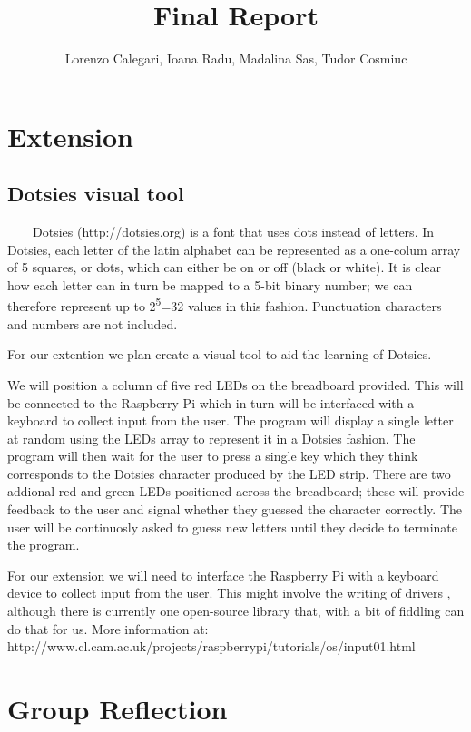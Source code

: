 \documentclass{article}
\newcommand{\tmrsup}[1]{\textsuperscript{#1}}
\begin{document}
\title{Final Report}\author{Lorenzo Calegari, Ioana Radu, Madalina Sas, Tudor
Cosmiuc}\maketitle

\section{Extension}

\subsection{Dotsies visual tool}

\ \ \ \ Dotsies (http://dotsies.org) is a font that uses dots instead of
letters. In Dotsies, each letter of the latin alphabet can be represented as a
one-colum array of 5 squares, or dots, which can either be on or off (black or
white). It is clear how each letter can in turn be mapped to a 5-bit binary
number; we can therefore represent up to 2\tmrsup{5}=32 values in this
fashion. Punctuation characters and numbers are not included.

For our extention we plan create a visual tool to aid the learning of Dotsies.

We will position a column of five red LEDs on the breadboard provided. This
will be connected to the Raspberry Pi which in turn will be interfaced with a
keyboard to collect input from the user. The program will display a single
letter at random using the LEDs array to represent it in a Dotsies fashion.
The program will then wait for the user to press a single key which they think
corresponds to the Dotsies character produced by the LED strip. There are two
addional red and green LEDs positioned across the breadboard; these will
provide feedback to the user and signal whether they guessed the character
correctly. The user will be continuosly asked to guess new letters until they
decide to terminate the program.

For our extension we will need to interface the Raspberry Pi with a keyboard
device to collect input from the user. This might involve the writing of
drivers , although there is currently one open-source library that, with a bit
of fiddling can do that for us. More information at:
http://www.cl.cam.ac.uk/projects/raspberrypi/tutorials/os/input01.html

\section{Group Reflection}
\end{document}
